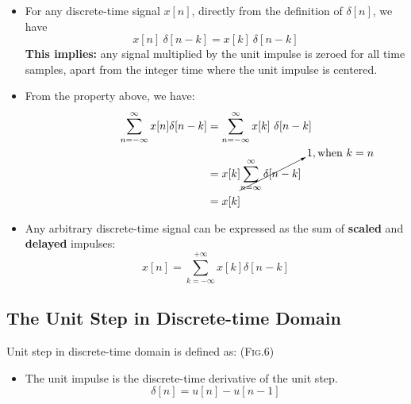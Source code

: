 \begin{itemize}
 \item For any discrete-time signal $x[n]$, directly from the definition of $\delta[n]$, we have
   \[ x[n] \ \delta[n-k] = x[k] \ \delta[n-k] \]
 \quad \textbf{This implies:} any signal multiplied by the unit impulse is zeroed for all time samples, apart from the integer
 time where the unit impulse is centered.
 \item From the property above, we have:
 \begin{align*} \begin{split}
  \sum_{n=-\infty}^{\infty}x[n]\delta[n-k]  &=  \sum_{n=-\infty}^{\infty}x[k] \ \delta[n-k] \\
  &= x[k] \cancelto{1, \text{when} \ k=n}{\sum_{n=\infty}^{\infty}\delta[n-k]} \\
  &= x[k]
 \end{split} \end{align*}
 \item Any arbitrary discrete-time signal can be expressed as the sum of \textbf{scaled} and \textbf{delayed} impulses:
 \[ x[n] = \sum_{k=-\infty}^{+\infty}x[k]\delta[n-k] \] 
\end{itemize}

\subsection{The Unit Step in Discrete-time Domain}
Unit step in discrete-time domain is defined as: (\textsc{Fig.6})\\
\begin{itemize}
 \item The unit impulse is the discrete-time derivative of the unit step.
 \[ \delta[n] = u[n] - u[n-1] \]
\end{itemize}

